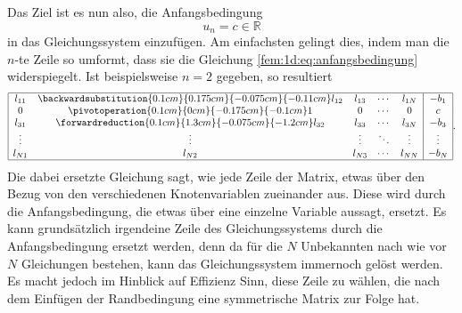Das Ziel ist es nun also, die Anfangsbedingung
\begin{equation}
    u_n = c \in \mathbb{R} 
    \label{fem:1d:eq:anfangsbedingung}
\end{equation}
in das Gleichungssystem einzufügen.
Am einfachsten gelingt dies, indem man die $n$-te Zeile so umformt, dass sie die Gleichung \eqref{fem:1d:eq:anfangsbedingung} widerspiegelt.
Ist beispielsweise $n = 2$ gegeben, so resultiert
\begin{equation}
    \begin{array}{|ccccc|c|}
        \hline
        l_{11} & 
        \backwardsubstitution{0.1cm}{0.175cm}{-0.075cm}{-0.11cm}
                 l_{12} & l_{13} & \cdots & l_{1N} & -b_1   \\
        0      & 
        \pivotoperation{0.1cm}{0cm}{-0.175cm}{-0.1cm}
                 1      & 0      & \cdots & 0      & c      \\
        l_{31} & 
        \forwardreduction{0.1cm}{1.3cm}{-0.075cm}{-1.2cm}
                 l_{32} & l_{33} & \cdots & l_{3N} & -b_3   \\
        \vdots & \vdots & \vdots & \ddots & \vdots & \vdots \\
        l_{N1} & l_{N2} & l_{N3} & \cdots & l_{NN} & -b_N   \\
        \hline
    \end{array}.
\end{equation}
Die dabei ersetzte Gleichung sagt, wie jede Zeile der Matrix, etwas über den Bezug von den verschiedenen Knotenvariablen zueinander aus.
Diese wird durch die Anfangsbedingung, die etwas über eine einzelne Variable aussagt, ersetzt.
Es kann grundsätzlich irgendeine Zeile des Gleichungssystems durch die Anfangsbedingung ersetzt werden, denn da für die $N$ Unbekannten nach wie vor $N$ Gleichungen bestehen, kann das Gleichungssystem immernoch gelöst werden.
Es macht jedoch im Hinblick auf Effizienz Sinn, diese Zeile zu wählen, die nach dem Einfügen der Randbedingung eine symmetrische Matrix zur Folge hat.

